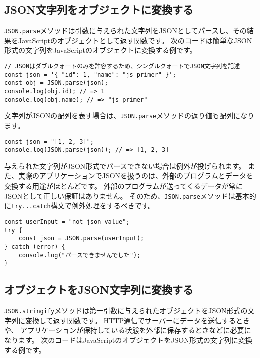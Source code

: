 \hypertarget{json-parse}{%
\subsection{JSON文字列をオブジェクトに変換する}\label{json-parse}}

\href{https://developer.mozilla.org/ja/docs/Web/JavaScript/Reference/Global_Objects/JSON/parse}{\texttt{JSON.parse}メソッド}は引数に与えられた文字列をJSONとしてパースし、その結果をJavaScriptのオブジェクトとして返す関数です。
次のコードは簡単なJSON形式の文字列をJavaScriptのオブジェクトに変換する例です。

\begin{lstlisting}
// JSONはダブルクォートのみを許容するため、シングルクォートでJSON文字列を記述
const json = '{ "id": 1, "name": "js-primer" }';
const obj = JSON.parse(json);
console.log(obj.id); // => 1
console.log(obj.name); // => "js-primer"
\end{lstlisting}

文字列がJSONの配列を表す場合は、\texttt{JSON.parse}メソッドの返り値も配列になります。

\begin{lstlisting}
const json = "[1, 2, 3]";
console.log(JSON.parse(json)); // => [1, 2, 3]
\end{lstlisting}

与えられた文字列がJSON形式でパースできない場合は例外が投げられます。
また、実際のアプリケーションでJSONを扱うのは、外部のプログラムとデータを交換する用途がほとんどです。
外部のプログラムが送ってくるデータが常にJSONとして正しい保証はありません。
そのため、\texttt{JSON.parse}メソッドは基本的に\texttt{try...catch}構文で例外処理をするべきです。

\begin{lstlisting}
const userInput = "not json value";
try {
    const json = JSON.parse(userInput);
} catch (error) {
    console.log("パースできませんでした");
}
\end{lstlisting}

\hypertarget{json-format}{%
\subsection{オブジェクトをJSON文字列に変換する}\label{json-format}}

\href{https://developer.mozilla.org/ja/docs/Web/JavaScript/Reference/Global_Objects/JSON/stringify}{\texttt{JSON.stringify}メソッド}は第一引数に与えられたオブジェクトをJSON形式の文字列に変換して返す関数です。
HTTP通信でサーバーにデータを送信するときや、
アプリケーションが保持している状態を外部に保存するときなどに必要になります。
次のコードはJavaScriptのオブジェクトをJSON形式の文字列に変換する例です。

